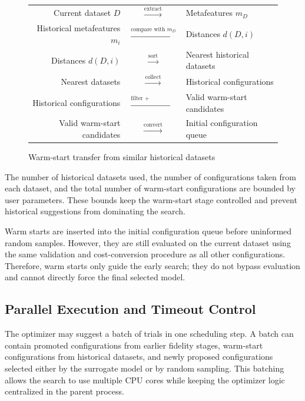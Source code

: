 \documentclass[12pt,a4paper,oneside]{report}
\begin{document}
\begin{figure}[H]
\centering
\renewcommand{\arraystretch}{1.25}
\begin{tabular}{rcl}
Current dataset \(D\)
& \(\xrightarrow{\text{extract}}\) &
Metafeatures \(m_D\) \\

Historical metafeatures \(m_i\)
& \(\xrightarrow{\text{compare with } m_D}\) &
Distances \(d(D,i)\) \\

Distances \(d(D,i)\)
& \(\xrightarrow{\text{sort}}\) &
Nearest historical datasets \\

Nearest datasets
& \(\xrightarrow{\text{collect}}\) &
Historical configurations \\

Historical configurations
& \(\xrightarrow{\text{filter + deduplicate}}\) &
Valid warm-start candidates \\

Valid warm-start candidates
& \(\xrightarrow{\text{convert}}\) &
Initial configuration queue \\
\end{tabular}
\caption{Warm-start transfer from similar historical datasets}
\label{fig:warm-start-transfer}
\end{figure}

\noindent The number of historical datasets used, the number of configurations taken from
each dataset, and the total number of warm-start configurations are bounded by
user parameters. These bounds keep the warm-start stage controlled and prevent
historical suggestions from dominating the search.

\noindent Warm starts are inserted into the initial configuration queue before uninformed
random samples. However, they are still evaluated on the current dataset using
the same validation and cost-conversion procedure as all other configurations.
Therefore, warm starts only guide the early search; they do not bypass
evaluation and cannot directly force the final selected model.

\subsection{Parallel Execution and Timeout Control}

The optimizer may suggest a batch of trials in one scheduling step. A batch can
contain promoted configurations from earlier fidelity stages, warm-start
configurations from historical datasets, and newly proposed configurations
selected either by the surrogate model or by random sampling. This batching
allows the search to use multiple CPU cores while keeping the optimizer logic
centralized in the parent process.
\end{document}
